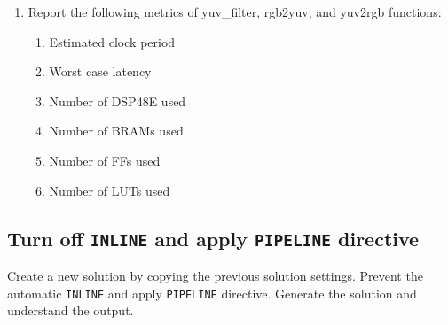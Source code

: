 \documentclass[a4paper,12pt,twoside]{article}
\begin{document}
\begin{enumerate}
    \item Report the following metrics of yuv\_filter, rgb2yuv, and yuv2rgb functions:
    \begin{enumerate}
        \item Estimated clock period
        \item Worst case latency
        \item Number of DSP48E used
        \item Number of BRAMs used
        \item Number of FFs used
        \item Number of LUTs used
    \end{enumerate}
\end{enumerate}
\subsection{Turn off \texttt{INLINE} and apply \texttt{PIPELINE} directive}\label{S24}
Create a new solution by copying the previous solution settings. Prevent the automatic \texttt{INLINE} and apply \texttt{PIPELINE} directive. Generate the solution and understand the output.
\end{document}
